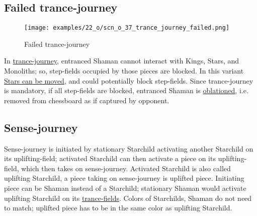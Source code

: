 \clearpage %

\subsection*{Failed trance-journey}
\label{sec:One/Starchild/Failed trance-journey}

\vspace*{-1.5\baselineskip}
\noindent
\begin{figure}[!h]
\texttt{[image: examples/22\_o/scn\_o\_37\_trance\_journey\_failed.png]}
\vspace*{-1.4\baselineskip}
\caption{Failed trance-journey}
\label{fig:scn_o_37_trance_journey_failed}
\end{figure}

\vspace*{-0.5\baselineskip}
In \hyperref[fig:scn_cot_082_light_shaman_trance_journey]{trance-journey}, entranced
Shaman cannot interact with Kings, Stars, and Monoliths; so, step-fields occupied by
those pieces are blocked. In this variant
\hyperref[fig:scn_o_09_starchild_moving_star_init]{Stars can be moved}, and could
potentially block step-fields. Since trance-journey is mandatory, if all step-fields
are blocked, entranced Shaman is \hyperref[sec:Terms/Oblation]{oblationed}, i.e.
removed from chessboard as if captured by opponent.

\clearpage %

\subsection*{Sense-journey}
\label{sec:One/Starchild/Sense-journey}

\vspace*{-0.7\baselineskip}
Sense-journey is initiated by stationary Starchild activating another Starchild
on its uplifting-field; activated Starchild can then activate a piece on its
uplifting-field, which then takes on sense-journey. Activated Starchild is also
called uplifting Starchild, a piece taking on sense-journey is uplifted piece.
Initiating piece can be Shaman instead of a Starchild; stationary Shaman would
activate uplifting Starchild on its
\hyperref[fig:scn_cot_070_trance_fields]{trance-fields}. Colors of Starchilds,
Shaman do not need to match; uplifted piece has to be in the same color as
uplifting Starchild.

